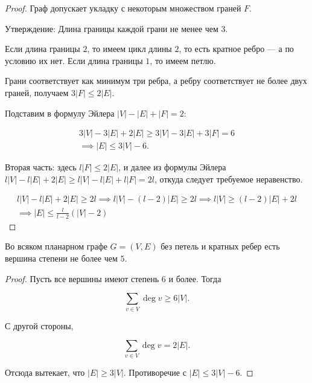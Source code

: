 \begin{proof}
    Граф допускает укладку с некоторым множеством граней $F$.
    
    Утверждение: Длина границы каждой грани не менее чем $3$.

    Если длина границы $2$, то имеем цикл длины $2$, то есть кратное ребро --- а по условию их нет. Если длина границы $1$, то имеем петлю.

    Грани соответствует как минимум три ребра, а ребру соответствует не более двух граней, получаем $3|F| \leq 2|E|$.

    Подставим в формулу Эйлера $|V| - |E| + |F| = 2$:


    \begin{gather*}
        3|V| - 3|E| + 2|E| \geq 3|V| - 3|E| + 3|F| = 6 \\
        \implies |E| \leq 3|V| - 6.
    \end{gather*}

    Вторая часть: здесь $l|F| \leq 2|E|$, и далее из формулы Эйлера $l|V| - l|E| + 2|E| \geq l|V| - l|E| + l|F| = 2l$, откуда следует требуемое неравенство.

    \begin{gather*}
        l|V| - l|E| + 2|E| \geq 2l \implies l|V| - (l - 2)|E| \geq 2l \implies l|V| \geq (l - 2)|E| + 2l\\
        \implies |E| \leq \frac{l}{l - 2}(|V| - 2) 
    \end{gather*}
\end{proof}

\begin{follow}
    Во всяком планарном графе $G = (V, E)$ без петель и кратных ребер есть вершина степени не более чем $5$.
\end{follow}

\begin{proof}
    Пусть все вершины имеют степень $6$ и более. Тогда 

    \[ \sum\limits_{v \in V} \deg v \geq 6|V|. \]

    С другой стороны,

    \[ \sum\limits_{v \in V} \deg v = 2|E|. \]

    Отсюда вытекает, что $|E| \geq 3|V|$. Противоречие с $|E| \leq 3|V| - 6$.

\end{proof}